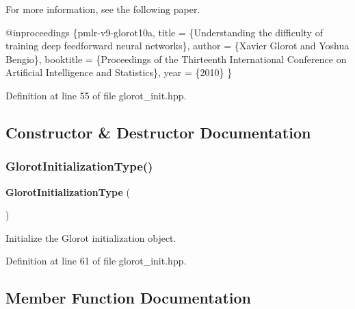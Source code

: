 For more information, see the following paper.


\begin{DoxyCode}
@inproceedings \{pmlr-v9-glorot10a,
 title     = \{Understanding the difficulty of training
              deep feedforward neural networks\},
 author    = \{Xavier Glorot and Yoshua Bengio\},
 booktitle = \{Proceedings of the Thirteenth International Conference
              on Artificial Intelligence and Statistics\},
 year      = \{2010\}
\}
\end{DoxyCode}
 

Definition at line 55 of file glorot\+\_\+init.\+hpp.



\subsection{Constructor \& Destructor Documentation}
\mbox{\label{classmlpack_1_1ann_1_1GlorotInitializationType_a31ca952a1516a5e8013efef9faa0d0e6}} 
\subsubsection{Glorot\+Initialization\+Type()}
{\footnotesize\ttfamily \textbf{ Glorot\+Initialization\+Type} (\begin{DoxyParamCaption}{ }\end{DoxyParamCaption})\hspace{0.3cm}{\ttfamily [inline]}}



Initialize the Glorot initialization object. 



Definition at line 61 of file glorot\+\_\+init.\+hpp.



\subsection{Member Function Documentation}
\mbox{\label{classmlpack_1_1ann_1_1GlorotInitializationType_a5cfe472251a41fffd45b170bb0d3c1bd}} 
